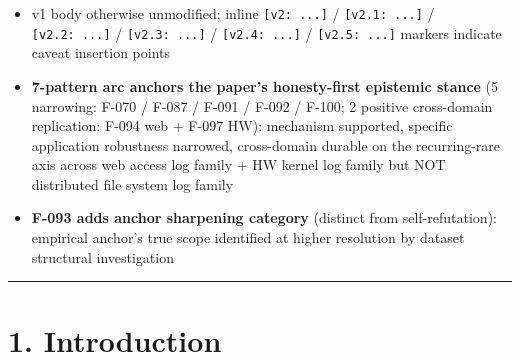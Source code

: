 \begin{itemize}
  N=4 attempt FAILED on Loghub HDFS\_v1 distributed file system log
  (100,000-BlockId subsample, 2.35M edges, 26 templates, 4.90\% anomaly).
  H\_R+\_literal Δ=\(-23.08\) pt FAIL (recurring rare benefit narrowing
  refuted on HDFS), H\_anomaly Δ=\(-4.30\) pt FAIL (HDFS-native anomaly
  preservation FAIL), Sanity inconsistent (one-shot disposal absent,
  reinforcing F-097 small-alphabet caveat). Cross-domain durability
  arc narrowed to \textbf{web access log family + HW kernel log family}
  specific (NASA HTTP + Apache error log + BGL Blue Gene/L), distributed
  file system log NOT covered. 6-pattern arc → \textbf{7-pattern arc}
  (5 narrow + 2 positive). Pre-reg \texttt{\_template\_pre\_reg.md} second
  high-severity test case: §0.1 anchor constraint predicted small-
  alphabet caveat would re-confirm → empirically borne out (sanity
  +0 pt, identical to F-097 BGL pattern); §0.3 observation/interpretation
  separation prevented narrative drift; protocol §5 explicit禁止
  ``literal FAIL but H\_anomaly PASS as N=4'' not triggered (both FAIL).
  ONE\_PAGER.md Path A SIEM PoC scope adjusted: HDFS-style distributed
  file system log out of scope, web/HW kernel log domain remains valid
\item
  v1 body otherwise unmodified; inline \texttt{{[}v2:\ ...{]}} / \texttt{{[}v2.1:\ ...{]}} /
  \texttt{{[}v2.2:\ ...{]}} / \texttt{{[}v2.3:\ ...{]}} / \texttt{{[}v2.4:\ ...{]}} / \texttt{{[}v2.5:\ ...{]}} markers
  indicate caveat insertion points
\item
  \textbf{7-pattern arc anchors the paper's honesty-first epistemic stance}
  (5 narrowing: F-070 / F-087 / F-091 / F-092 / F-100; 2 positive
  cross-domain replication: F-094 web + F-097 HW): mechanism supported,
  specific application robustness narrowed, cross-domain durable on the
  recurring-rare axis across web access log family + HW kernel log
  family but NOT distributed file system log family
\item
  \textbf{F-093 adds anchor sharpening category} (distinct from
  self-refutation): empirical anchor's true scope identified at higher
  resolution by dataset structural investigation
\end{itemize}

\begin{center}\rule{0.5\linewidth}{0.5pt}\end{center}

\section{1. Introduction}\label{introduction}

